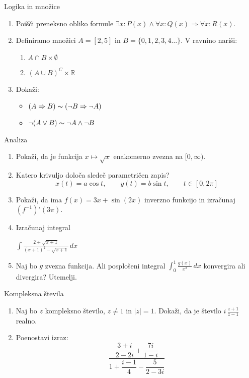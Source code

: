 \begin{frame}{Logika in množice}
	\begin{enumerate}
		\item
		Poišči preneksno obliko formule
		$\exists x: P(x)\wedge \forall x: Q(x)\Rightarrow \forall x: R(x).$
		\item 
		Definiramo množici $A=[2,5]$ in $B=\{0,1,2,3,4 \ldots \}$.
		V ravnino nariši:
		\begin{enumerate}
		   \item $A \cap B \times \emptyset$
		   \item $(A \cup B)^C \times \mathbb{R} $
		\end{enumerate}
		\item
		Dokaži:
		\begin{itemize}
			\item $(A\Rightarrow B)\thicksim (\lnot B\Rightarrow \lnot A)$
			\item $\lnot (A\vee B)\thicksim \lnot A \wedge \lnot B$
		\end{itemize}
	\end{enumerate}
\end{frame}

\begin{frame}{Analiza}
	\begin{enumerate}
		\item
		Pokaži, da je funkcija $x\mapsto \sqrt{x}$ enakomerno zvezna na $[0,\infty )$.
		\item 
		Katero krivuljo določa sledeč parametričen zapis?
		$$
		   x(t) = a \cos t, \qquad %
		   y(t) = b \sin t, \qquad %
		   t \in [0, 2 \pi]
		$$ 
		\item
		Pokaži, da ima $f(x)=3x+\sin(2x)$ inverzno funkcijo in izračunaj $(f^{-1})'(3\pi)$.
		
		\item
		Izračunaj integral 
		
		$\displaystyle \int \frac{2+\sqrt{x+1}}{(x+1)^2-\sqrt{x+1}} \,dx $
		\item 
		Naj bo $g$ zvezna funkcija. Ali posplošeni integral 
		$ \int_{0}^{1} \frac{g(x)}{x^2}  \,dx$
		konvergira ali divergira? Utemelji.
	\end{enumerate}
\end{frame}

\begin{frame}{Kompleksna števila}
	\begin{enumerate}
		\item
		Naj bo $z$ kompleksno število, $z \ne 1$ in $|z|=1$.
		Dokaži, da je število \( i \, \frac{z+1}{z-1} \) realno.
		\item
		Poenostavi izraz:
		$$\frac{\dfrac{3+i}{2-2i}+\dfrac{7i}{1-i}}{1+\dfrac{i-1}{4}-\dfrac{5}{2-3i}}$$
	\end{enumerate}
\end{frame}
